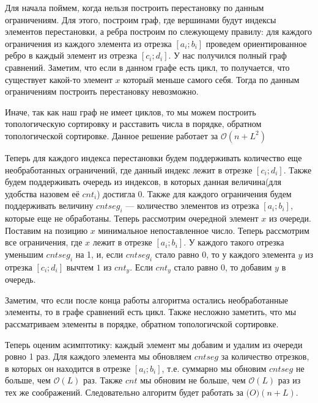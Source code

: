 \documentclass[12pt,a4paper]{report}
\begin{document}
Для начала поймем, когда нельзя построить перестановку по данным ограничениям. Для этого, построим граф, где вершинами будут индексы элементов перестановки, а ребра построим по слежующему правилу: для каждого ограничения из каждого элемента из отрезка $[a_i;b_i]$ проведем ориентированное ребро в каждый элемент из отрезка $[c_i;d_i]$. У нас получился полный граф сравнений. Заметим, что если в данном графе есть цикл, то получается, что существует какой-то элемент $x$ который меньше самого себя. Тогда по данным ограничениям построить перестановку невозможно. \par
Иначе, так как наш граф не имеет циклов, то мы можем построить топологическую сортировку и расставить числа в порядке, обратном топологической сортировке. Данное решение работает за $\mathcal{O}(n+L^2)$ \par
Теперь для каждого индекса перестановки будем поддерживать количество еще необработанных ограничений, где данный индекс лежит в отрезке $[c_i;d_i]$. Также будем поддерживать очередь из индексов, в которых данная величина(для удобства назовем её $cnt_i$) достигла $0$. Также для каждого ограничения будем поддерживать величину $cntseg_i$ --- количество элементов из отрезка $[a_i;b_i]$, которые еще не обработаны. Теперь рассмотрим очередной элемент $x$ из очереди. Поставим на позицию $x$ минимальное непоставленное число. Теперь рассмотрим все ограничения, где $x$ лежит в отрезке $[a_i;b_i]$. У каждого такого отрезка уменьшим $cntseg_i$ на 1, и, если $cntseg_i$ стало равно $0$, то у каждого элемента $y$ из отрезка $[c_i;d_i]$ вычтем $1$ из $cnt_y$. Если $cnt_y$ стало равно $0$, то добавим $y$ в очередь. \par
Заметим, что если после конца работы алгоритма остались необработанные элементы, то в графе сравнений есть цикл. Также несложно заметить, что мы рассматриваем элементы в порядке, обратном топологичской сортировке. \par
Теперь оценим асимптотику: каждый элемент мы добавим и удалим из очереди ровно 1 раз. Для каждого элемента мы обновляем $cntseg$ за количество отрезков, в которых он находится в отрезке $[a_i;b_i]$, т.е. суммарно мы обновим $cntseg$ не больше, чем $\mathcal{O}(L)$ раз. Также $cnt$ мы обновим не больше, чем $\mathcal{O}(L)$ раз из тех же соображений. Следовательно алгоритм будет работать за $\mathcal(O)(n + L)$. 
\end{document}
